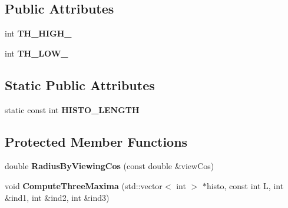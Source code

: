 \subsection*{Public Attributes}
\begin{DoxyCompactItemize}
\item 
int {\bfseries T\+H\+\_\+\+H\+I\+G\+H\+\_\+}\hypertarget{classMultiColSLAM_1_1cORBmatcher_a9e54a7338c3eb1606069903c1f93779b}{}\label{classMultiColSLAM_1_1cORBmatcher_a9e54a7338c3eb1606069903c1f93779b}

\item 
int {\bfseries T\+H\+\_\+\+L\+O\+W\+\_\+}\hypertarget{classMultiColSLAM_1_1cORBmatcher_ab422ea8a1a6e3e7f56c4d1754f7d5375}{}\label{classMultiColSLAM_1_1cORBmatcher_ab422ea8a1a6e3e7f56c4d1754f7d5375}

\end{DoxyCompactItemize}
\subsection*{Static Public Attributes}
\begin{DoxyCompactItemize}
\item 
static const int {\bfseries H\+I\+S\+T\+O\+\_\+\+L\+E\+N\+G\+TH}\hypertarget{classMultiColSLAM_1_1cORBmatcher_a6149dc3562f596047a3b8547f3afdfd1}{}\label{classMultiColSLAM_1_1cORBmatcher_a6149dc3562f596047a3b8547f3afdfd1}

\end{DoxyCompactItemize}
\subsection*{Protected Member Functions}
\begin{DoxyCompactItemize}
\item 
double {\bfseries Radius\+By\+Viewing\+Cos} (const double \&view\+Cos)\hypertarget{classMultiColSLAM_1_1cORBmatcher_a56895b1d3c05064d0f002d31583c200a}{}\label{classMultiColSLAM_1_1cORBmatcher_a56895b1d3c05064d0f002d31583c200a}

\item 
void {\bfseries Compute\+Three\+Maxima} (std\+::vector$<$ int $>$ $\ast$histo, const int L, int \&ind1, int \&ind2, int \&ind3)\hypertarget{classMultiColSLAM_1_1cORBmatcher_a63bbfc01193babeda1b94ab8820f13a1}{}\label{classMultiColSLAM_1_1cORBmatcher_a63bbfc01193babeda1b94ab8820f13a1}

\end{DoxyCompactItemize}

